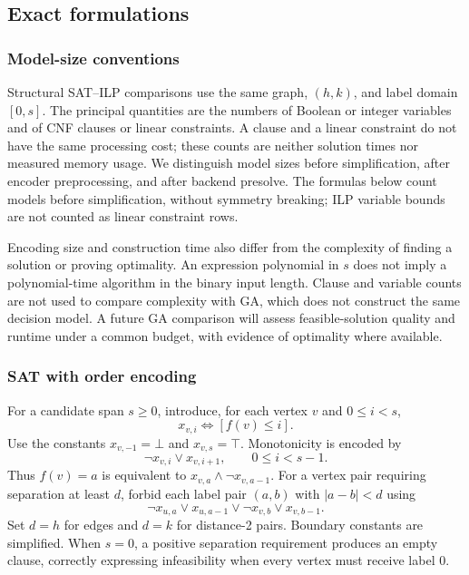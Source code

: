 \subsection{Exact formulations}
\subsubsection{Model-size conventions}
Structural SAT--ILP comparisons use the same graph, $(h,k)$, and label domain
$[0,s]$. The principal quantities are the numbers of Boolean or integer
variables and of CNF clauses or linear constraints. A clause and a linear
constraint do not have the same processing cost; these counts are neither
solution times nor measured memory usage. We distinguish model sizes before
simplification, after encoder preprocessing, and after backend presolve.
The formulas below count models before simplification, without symmetry
breaking; ILP variable bounds are not counted as linear constraint rows.

Encoding size and construction time also differ from the complexity of
finding a solution or proving optimality. An expression polynomial in $s$
does not imply a polynomial-time algorithm in the binary input length.
Clause and variable counts are not used to compare complexity with GA,
which does not construct the same decision model. A future GA comparison
will assess feasible-solution quality and runtime under a common budget,
with evidence of optimality where available.

\subsubsection{SAT with order encoding}
For a candidate span $s\geq0$, introduce, for each vertex $v$ and $0\leq i<s$,
\[
 x_{v,i}\Longleftrightarrow [f(v)\leq i].
\]
Use the constants $x_{v,-1}=\bot$ and $x_{v,s}=\top$. Monotonicity is encoded by
\begin{equation}
 \neg x_{v,i}\lor x_{v,i+1},\qquad 0\leq i<s-1.
\end{equation}
Thus $f(v)=a$ is equivalent to $x_{v,a}\land\neg x_{v,a-1}$. For a vertex pair
requiring separation at least $d$, forbid each label pair $(a,b)$ with $|a-b|<d$ using
\begin{equation}\label{eq:forbidden}
 \neg x_{u,a}\lor x_{u,a-1}\lor\neg x_{v,b}\lor x_{v,b-1}.
\end{equation}
Set $d=h$ for edges and $d=k$ for distance-2 pairs. Boundary constants are
simplified. When $s=0$, a positive separation requirement produces an empty
clause, correctly expressing infeasibility when every vertex must receive label 0.

